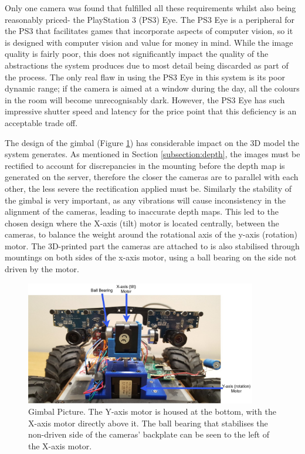 Only one camera was found that fulfilled all these requirements whilst also being reasonably priced- the PlayStation 3 (PS3) Eye. The PS3 Eye is a peripheral for the PS3 that facilitates games that incorporate aspects of computer vision, so it is designed with computer vision and value for money in mind. While the image quality is fairly poor, this does not significantly impact the quality of the abstractions the system produces due to most detail being discarded as part of the process. The only real flaw in using the PS3 Eye in this system is its poor dynamic range; if the camera is aimed at a window during the day, all the colours in the room will become unrecognisably dark. However, the PS3 Eye has such impressive shutter speed and latency for the price point that this deficiency is an acceptable trade off.

The design of the gimbal (Figure \ref{fig:gimble}) has considerable impact on the 3D model the system generates. As mentioned in Section \ref{subsection:depth}, the images must be rectified to account for discrepancies in the mounting before the depth map is generated on the server, therefore the closer the cameras are to parallel with each other, the less severe the rectification applied must be. Similarly the stability of the gimbal is very important, as any vibrations will cause inconsistency in the alignment of the cameras, leading to inaccurate depth maps. This led to the chosen design where the X-axis (tilt) motor is located centrally, between the cameras, to balance the weight around the rotational axis of the y-axis (rotation) motor. The 3D-printed part the cameras are attached to is also stabilised through mountings on both sides of the x-axis motor, using a ball bearing on the side not driven by the motor. 

\begin{figure}[H]
    \begin{center}
      \includegraphics[width=0.9\textwidth]{Figures/GimbleLabel.jpg}
      \caption[Gimbal Picture]{Gimbal Picture. The Y-axis motor is housed at the bottom, with the X-axis motor directly above it. The ball bearing that stabilises the non-driven side of the cameras' backplate can be seen to the left of the X-axis motor.}
      \label{fig:gimble}
    \end{center}
\end{figure}

